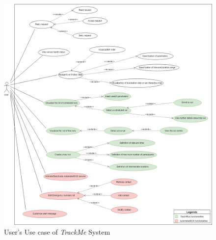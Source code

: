 \begin{figure}[H]
    \centering
    \includegraphics[scale=0.4]{./Pictures/trackMeUseCaseUser.png}
    \caption{User's Use case of \emph{TrackMe} System}
\end{figure}

